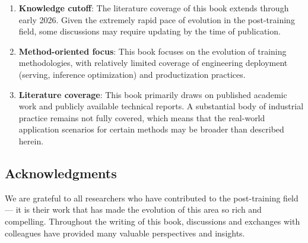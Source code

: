 \begin{enumerate}[leftmargin=2em]
  \item \textbf{Knowledge cutoff}: The literature coverage of this book extends through early 2026.
    Given the extremely rapid pace of evolution in the post-training field, some discussions may require updating by the time of publication.

  \item \textbf{Method-oriented focus}: This book focuses on the evolution of training methodologies,
    with relatively limited coverage of engineering deployment (serving, inference optimization) and productization practices.

  \item \textbf{Literature coverage}: This book primarily draws on published academic work and publicly available technical reports.
    A substantial body of industrial practice remains not fully covered,
    which means that the real-world application scenarios for certain methods may be broader than described herein.
\end{enumerate}

\subsection*{Acknowledgments}

We are grateful to all researchers who have contributed to the post-training field---
it is their work that has made the evolution of this area so rich and compelling.
Throughout the writing of this book, discussions and exchanges with colleagues have provided many valuable perspectives and insights.
